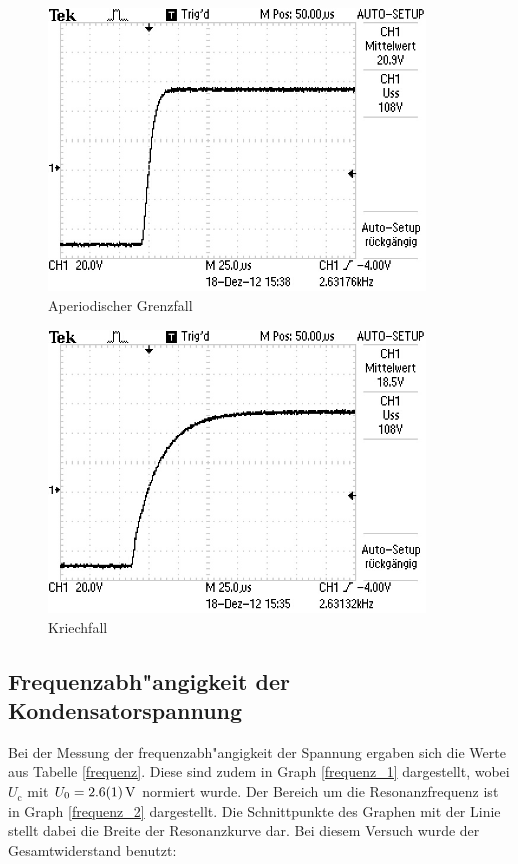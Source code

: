 		\begin{figure}[!h]
			\centering
			\includegraphics[width = 10cm]{img/F0002TEK.jpg}
			\caption{Aperiodischer Grenzfall}
			\label{ap_2}
		\end{figure}

	\begin{figure}[!h]
		\centering
		\includegraphics[width = 10cm]{img/F0001TEK.jpg}
		\caption{Kriechfall}
		\label{ap_3}
	\end{figure}

	\newpage

	\subsection{Frequenzabh"angigkeit der Kondensatorspannung} %
	\label{sub:frequenzabh"angigkeit_der_kondensatorspannung}
	
	Bei der Messung der frequenzabh"angigkeit der Spannung ergaben sich die Werte aus Tabelle \eqref{frequenz}.
	Diese sind zudem in Graph \eqref{frequenz_1} dargestellt, wobei $U_\mathrm{c}$ mit $U_\mathrm{0} = \SI{2.6 (1)}{\volt}$ normiert wurde.
	Der Bereich um die Resonanzfrequenz ist in Graph \eqref{frequenz_2} dargestellt. Die Schnittpunkte des Graphen mit der Linie stellt dabei die Breite der Resonanzkurve dar.
	Bei diesem Versuch wurde der Gesamtwiderstand benutzt:

